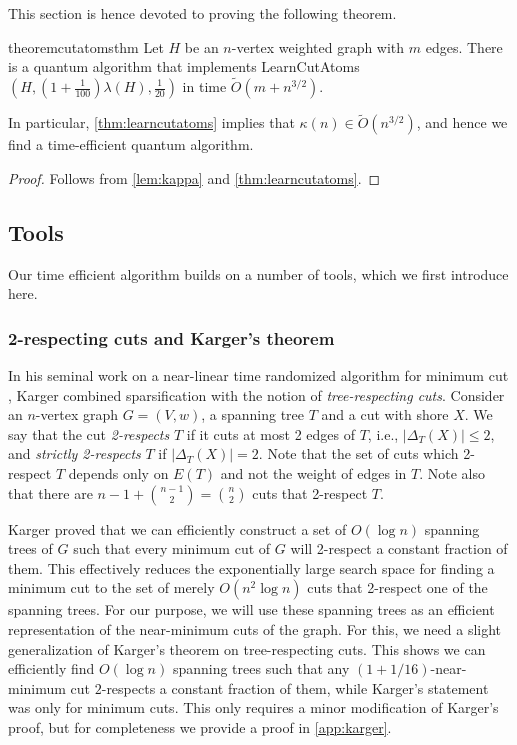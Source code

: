 \documentclass[10pt,a4paper]{article}
\newcommand{\tO}{\tilde O}
\newcommand{\1}{\mathbf{1}}
\theoremstyle{definition}
\begin{document}
This section is hence devoted to proving the following theorem. 
\begin{restatable}{theorem}{cutatomsthm} \label{thm:learncutatoms}
Let $H$ be an $n$-vertex weighted graph with $m$ edges.
There is a quantum algorithm that implements LearnCutAtoms$(H,(1+\frac{1}{100})\lambda(H),\frac{1}{20})$ in time $\tO(m + n^{3/2})$.
\end{restatable}

In particular, \cref{thm:learncutatoms} implies that $\kappa(n) \in \tO(n^{3/2})$, and hence we find a time-efficient quantum algorithm.
\thmtime*

\begin{proof}
Follows from \cref{lem:kappa} and \cref{thm:learncutatoms}.  
\end{proof}

\subsection{Tools}

Our time efficient algorithm builds on a number of tools, which we first introduce here.

\subsubsection{2-respecting cuts and Karger's theorem}

In his seminal work on a near-linear time randomized algorithm for minimum cut \cite{Karger00}, Karger combined sparsification with the notion of \emph{tree-respecting cuts}.
Consider an $n$-vertex graph $G = (V,w)$, a spanning tree $T$ and a cut with shore $X$.
We say that the cut \emph{2-respects} $T$ if it cuts at most 2 edges of $T$, i.e., $|\Delta_T(X)| \leq 2$, and \emph{strictly 2-respects} $T$ if $|\Delta_T(X)| = 2$.  Note that 
the set of cuts which 2-respect $T$ depends only on $E(T)$ and not the weight of edges in $T$.  Note also that there are $n-1 + \binom{n-1}{2} = \binom{n}{2}$ cuts that 2-respect $T$.

Karger proved that we can efficiently construct a set of $O(\log n)$ spanning trees of $G$ such that every minimum cut of $G$ will 2-respect a constant fraction of them.
This effectively reduces the exponentially large search space for finding a minimum cut to the set of merely $O(n^2 \log n)$ cuts that 2-respect one of the spanning trees.
For our purpose, we will use these spanning trees as an efficient representation of the near-minimum cuts of the graph.  For this, we need a slight generalization of Karger's theorem 
on tree-respecting cuts.  This shows we can efficiently find $O(\log n)$ spanning trees such that any $(1+1/16)$-near-minimum cut $2$-respects a constant fraction of them, while Karger's statement was 
only for minimum cuts.  This only requires a minor modification of Karger's proof, but for completeness we provide a proof in \cref{app:karger}. 
\end{document}

